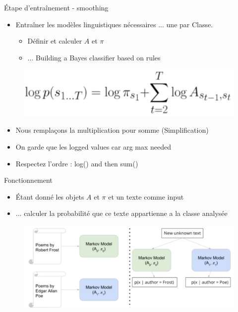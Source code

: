 \documentclass[aspectratio=169,xcolor=dvipsnames, t]{beamer}
\begin{document}
\begin{frame}{Étape d'entraînement - smoothing}
	\begin{itemize}
		\item Entraîner les modèles linguistiques nécessaires ... une par Classe.
		\begin{itemize}
			\item Définir et calculer $A$ et $\pi$ 
			\item ... Building a Bayes classifier based on rules
		\end{itemize}
	\end{itemize}
	
	\begin{figure}
		\includegraphics[height=0.2\paperheight]{figures/eqSmoothed.png}
	\end{figure}

	\begin{itemize}
		\item Nous remplaçons la multiplication pour somme (Simplification)
		\item On garde que les logged values car arg max needed
		\item Respectez l'ordre : log() and then sum()
	\end{itemize}
	
\end{frame}

\begin{frame}{Fonctionnement}
\begin{itemize}
	\item Étant donné les objets $A$ et $\pi$ et un texte comme input
	\item ... calculer la probabilité que ce texte appartienne a la classe analysée
\end{itemize}

\begin{figure}
	\includegraphics[height=0.5\paperheight]{figures/img1.png}
\end{figure}


\end{frame}
\end{document}
